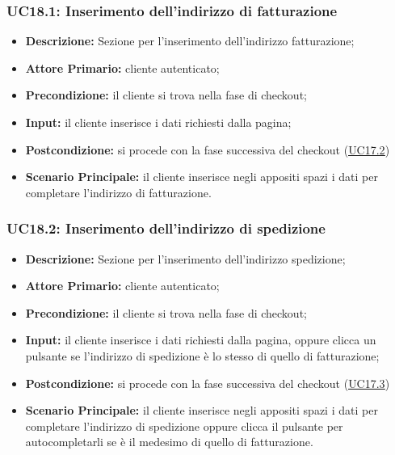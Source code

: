             \subsubsection{UC18.1: Inserimento dell'indirizzo di fatturazione}
            \label{sec:UC18.1}
                \begin{itemize}
                    \item \textbf{Descrizione:} Sezione per l'inserimento dell'indirizzo fatturazione;
                    \item \textbf{Attore Primario:} cliente autenticato;
                    \item \textbf{Precondizione:} il cliente si trova nella fase di checkout;
                    \item \textbf{Input:} il cliente inserisce i dati richiesti dalla pagina;
                    \item \textbf{Postcondizione:} si procede con la fase successiva del checkout (\hyperref[sec:UC17.2]{\underline{UC17.2}})
                    \item \textbf{Scenario Principale:} il cliente inserisce negli appositi spazi i dati per completare l'indirizzo di fatturazione.
                \end{itemize}
            \subsubsection{UC18.2: Inserimento dell'indirizzo di spedizione}
            \label{sec:UC18.2}
                \begin{itemize}
                    \item \textbf{Descrizione:} Sezione per l'inserimento dell'indirizzo spedizione;
                    \item \textbf{Attore Primario:} cliente autenticato;
                    \item \textbf{Precondizione:} il cliente si trova nella fase di checkout;
                    \item \textbf{Input:} il cliente inserisce i dati richiesti dalla pagina, oppure clicca un pulsante se l'indirizzo di spedizione è lo stesso di quello di fatturazione;
                    \item \textbf{Postcondizione:} si procede con la fase successiva del checkout (\hyperref[sec:UC17.3]{\underline{UC17.3}})
                    \item \textbf{Scenario Principale:} il cliente inserisce negli appositi spazi i dati per completare l'indirizzo di spedizione oppure clicca il pulsante per autocompletarli se è il medesimo di quello di fatturazione.
                \end{itemize}
